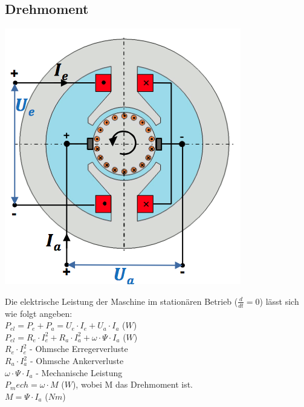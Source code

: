 \subsection{Drehmoment}
\begin{minipage}{0.4 \linewidth}
\includegraphics[width = \linewidth]{./Pics/VL45/GSMErsatzschaltbild}
\end{minipage}
\begin{minipage}{0.6 \linewidth}
Die elektrische Leistung der Maschine im stationären Betrieb ($\frac{d}{dt} = 0$) lässt sich wie folgt angeben: \\

$P_{el} = P_e + P_a = U_e \cdot I_e + U_a \cdot I_a$ ($W$) \\

$P_{el} = R_e \cdot I_e^2 + R_a \cdot I_a^2 + \omega \cdot \Psi \cdot I_a$ ($W$) \\

$R_e \cdot I_e^2$  - Ohmsche Erregerverluste \\

$R_a \cdot I_a^2$  - Ohmsche Ankerverluste \\

$\omega \cdot \Psi \cdot I_a$ -  Mechanische Leistung \\

$P_mech = \omega \cdot M$ ($W$), wobei M das Drehmoment ist. \\

$M = \Psi \cdot I_a$ ($Nm$)
\end{minipage}

